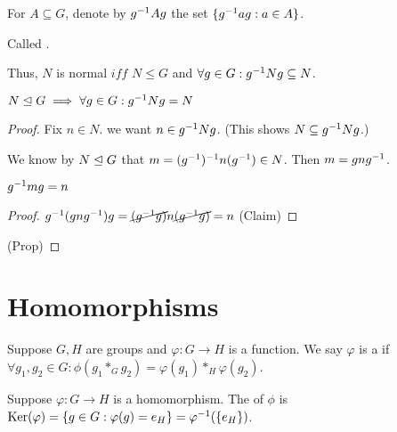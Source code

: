 \documentclass[notes.tex]{subfiles}
\begin{document}
\begin{defn}
	For $A\subseteq G$, denote by ${g}^{-1}Ag$ the set $\{{g}^{-1}ag : a\in A\}$.

	Called .
\end{defn}

\begin{remark}
	Thus, $N$ is normal $iff$ $N\le G$ and $\forall g\in G: {g}^{-1}Ng \subseteq N$.
\end{remark}

\begin{proposition}
	$N\trianglelefteq G \implies \forall g\in G: {g}^{-1}Ng=N$
\end{proposition}
\begin{proof}
	Fix $n\in N$. we want $n\in {g}^{-1}Ng$. (This shows $N\subseteq{g}^{-1}Ng$.)

	We know by $N\trianglelefteq G$ that $m =({g}^{-1})^{-1}n({g}^{-1})\in N$.
	Then $m=gn{g}^{-1}$.
	\begin{claim}
		${g}^{-1}mg=n$
	\end{claim}
	\begin{proof}
		${g}^{-1}(gn{g}^{-1})g=\cancel{({g}^{-1}g)}n\cancel{({g}^{-1}g)} = n$
		\qedhere(Claim)
	\end{proof}
	\qedhere(Prop)
\end{proof}


\chapter{Homomorphisms}
\begin{defn}
	Suppose $G, H$ are groups and $\varphi:G\to H$ is a function.
	We say $\varphi$ is a  if $\forall g_1, g_2\in G: \phi(g_1 *_G g_2) = \varphi(g_1) *_H \varphi(g_2)$.
\end{defn}

\begin{defn}
	Suppose $\varphi:G\to H$ is a homomorphism. The  of $\phi$ is $\operatorname{\mathrm{Ker}}(\varphi) = \{g\in G : \varphi(g) = e_H\} = \varphi^{-1}(\{e_H\})$.
\end{defn}
\end{document}
